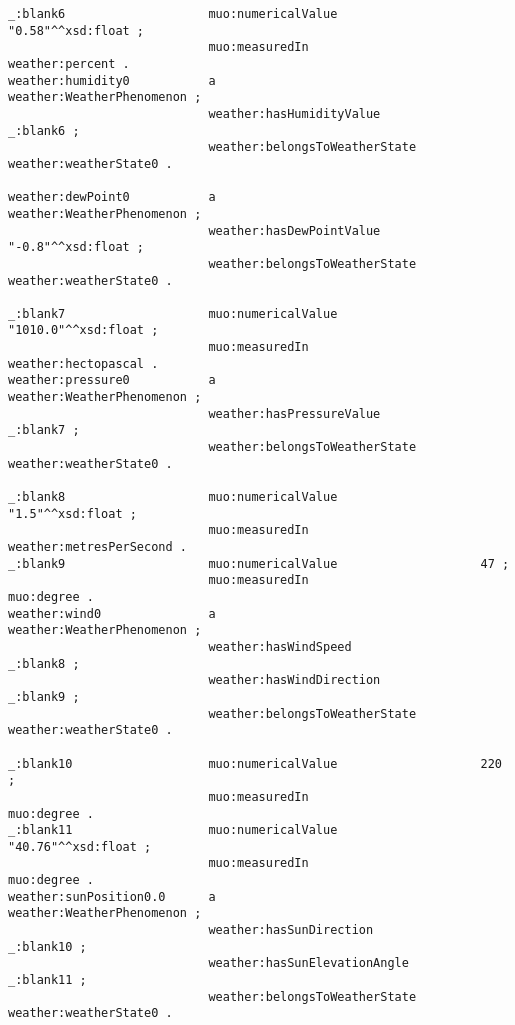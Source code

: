 \begin{lstlisting}
_:blank6                    muo:numericalValue                    "0.58"^^xsd:float ;
                            muo:measuredIn                        weather:percent .
weather:humidity0           a                                     weather:WeatherPhenomenon ;
                            weather:hasHumidityValue              _:blank6 ;
                            weather:belongsToWeatherState         weather:weatherState0 .

weather:dewPoint0           a                                     weather:WeatherPhenomenon ;
                            weather:hasDewPointValue              "-0.8"^^xsd:float ;
                            weather:belongsToWeatherState         weather:weatherState0 .

_:blank7                    muo:numericalValue                    "1010.0"^^xsd:float ;
                            muo:measuredIn                        weather:hectopascal .
weather:pressure0           a                                     weather:WeatherPhenomenon ;
                            weather:hasPressureValue              _:blank7 ;
                            weather:belongsToWeatherState         weather:weatherState0 .

_:blank8                    muo:numericalValue                    "1.5"^^xsd:float ;
                            muo:measuredIn                        weather:metresPerSecond .
_:blank9                    muo:numericalValue                    47 ;
                            muo:measuredIn                        muo:degree .
weather:wind0               a                                     weather:WeatherPhenomenon ;
                            weather:hasWindSpeed                  _:blank8 ;
                            weather:hasWindDirection              _:blank9 ;
                            weather:belongsToWeatherState         weather:weatherState0 .

_:blank10                   muo:numericalValue                    220 ;
                            muo:measuredIn                        muo:degree .
_:blank11                   muo:numericalValue                    "40.76"^^xsd:float ;
                            muo:measuredIn                        muo:degree .
weather:sunPosition0.0      a                                     weather:WeatherPhenomenon ;
                            weather:hasSunDirection               _:blank10 ;
                            weather:hasSunElevationAngle          _:blank11 ;
                            weather:belongsToWeatherState         weather:weatherState0 .


\end{lstlisting}
